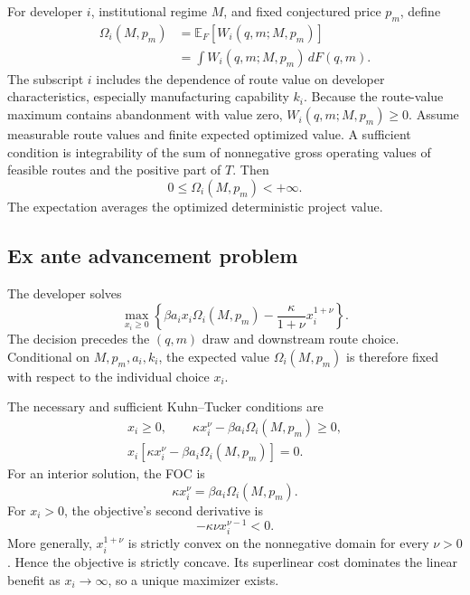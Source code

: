 For developer \(i\), institutional regime \(M\), and fixed conjectured price
\(p_m\), define
\begin{equation}
  \begin{aligned}
  \Omega_i(M,p_m)
  &=
  \mathbb E_F\!\left[
    W_i(q,m;M,p_m)
  \right]\\
  &=
  \int W_i(q,m;M,p_m)\,dF(q,m).
  \end{aligned}
  \label{eq:p05-expected-value}
\end{equation}
The subscript \(i\) includes the dependence of route value on developer
characteristics, especially manufacturing capability \(k_i\). Because the
route-value maximum contains abandonment with value zero,
\(W_i(q,m;M,p_m)\geq0\). Assume measurable route values and finite expected optimized value. A
sufficient condition is integrability of the sum of nonnegative gross
operating values of feasible routes and the positive part of \(T\). Then
\[
  0\leq\Omega_i(M,p_m)<+\infty.
\]
The expectation averages the optimized deterministic project value.

\subsection{Ex ante advancement problem}
\label{subsec:p05-problem}

The developer solves
\begin{equation}
  \max_{x_i\geq0}
  \left\{
    \beta a_ix_i\Omega_i(M,p_m)
    -
    \frac{\kappa}{1+\nu}x_i^{1+\nu}
  \right\}.
  \label{eq:p05-advancement-objective}
\end{equation}
The decision precedes the \((q,m)\) draw and downstream route choice.
Conditional on \(M,p_m,a_i,k_i\), the expected value
\(\Omega_i(M,p_m)\) is therefore fixed with respect to the individual
choice \(x_i\).

The necessary and sufficient Kuhn--Tucker conditions are
\begin{equation}
  \begin{gathered}
  x_i\geq0,\qquad
  \kappa x_i^\nu-\beta a_i\Omega_i(M,p_m)\geq0,\\
  x_i\left[
    \kappa x_i^\nu-\beta a_i\Omega_i(M,p_m)
  \right]=0.
  \end{gathered}
  \label{eq:p05-kkt}
\end{equation}
For an interior solution, the FOC is
\begin{equation}
  \kappa x_i^\nu
  =
  \beta a_i\Omega_i(M,p_m).
  \label{eq:p05-foc}
\end{equation}
For \(x_i>0\), the objective's second derivative is
\begin{equation}
  -\kappa\nu x_i^{\nu-1}<0.
  \label{eq:p05-soc}
\end{equation}
More generally, \(x_i^{1+\nu}\) is strictly convex on the nonnegative
domain for every \(\nu>0\). Hence the objective is strictly concave.
Its superlinear cost dominates the linear benefit as \(x_i\to\infty\), so a
unique maximizer exists.

